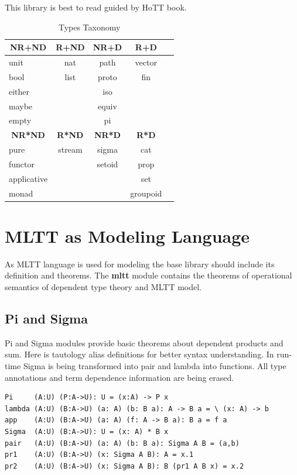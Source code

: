 \documentclass{article}
\newcommand*{\thead}[1]{\multicolumn{1}{c}{\bfseries #1}}
\begin{document}
This library is best to read guided by HoTT book.

\begin{table}[h]
\centering
\caption{Types Taxonomy}
\label{tab:a}
\begin{tabular}{lcccc}
\hline
\thead{NR+ND} & \thead{R+ND} & \thead{NR+D} & \thead{R+D}\\
\hline
unit        & nat    & path    & vector \\
bool        & list   & proto   & fin \\
either      &        & iso     &  \\
maybe       &        & equiv   &  \\
empty       &        & pi       &  \\
\hline
\thead{NR*ND} & \thead{R*ND} & \thead{NR*D} & \thead{R*D}\\
\hline
pure        & stream & sigma   & cat  \\
functor     &        & setoid  & prop \\
applicative &        &         & set  \\
monad       &        &         & groupoid \\
\end{tabular}
\end{table}

\newpage
\section{MLTT as Modeling Language}

As MLTT language is used for modeling the base library should include its definition and theorems.
The {\bf mltt} module contains the theorems of operational semantics of
dependent type theory and MLTT model.

\subsection{Pi and Sigma}

Pi and Sigma modules provide basic theorems about dependent products and sum.
Here is tautology alias definitions for better syntax understanding.
In run-time Sigma is being transformed into pair and lambda into functions.
All type annotations and term dependence information are being erased.

\begin{lstlisting}[mathescape=true]
Pi     (A:U) (P:A->U): U = (x:A) -> P x
lambda (A:U) (B:A->U) (a: A) (b: B a): A -> B a = \ (x: A) -> b
app    (A:U) (B:A->U) (a: A) (f: A -> B a): B a = f a
Sigma  (A:U) (B:A->U): U = (x: A) * B x
pair   (A:U) (B:A->U) (a: A) (b: B a): Sigma A B = (a,b)
pr1    (A:U) (B:A->U) (x: Sigma A B): A = x.1
pr2    (A:U) (B:A->U) (x: Sigma A B): B (pr1 A B x) = x.2
\end{lstlisting}
\end{document}
